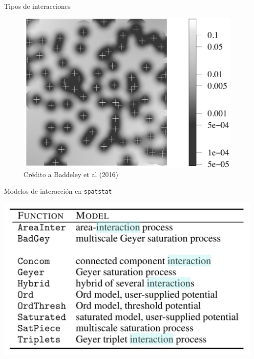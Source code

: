 \documentclass[
  11pt,
  ignorenonframetext,
]{beamer}
\begin{document}
\begin{frame}{Tipos de interacciones}
\protect\hypertarget{tipos-de-interacciones}{}
\begin{figure}

{\centering \includegraphics{Figuras/Tipos-interacciones} 

}

\caption{Crédito a Baddeley et al (2016)}\label{fig:unnamed-chunk-25}
\end{figure}
\end{frame}

\begin{frame}{Modelos de interacción en \texttt{spatstat}}
\protect\hypertarget{modelos-de-interacciuxf3n-en-spatstat}{}
\begin{center}\includegraphics{Figuras/Tabla-tipos-interacciones} \end{center}
\end{frame}
\end{document}
